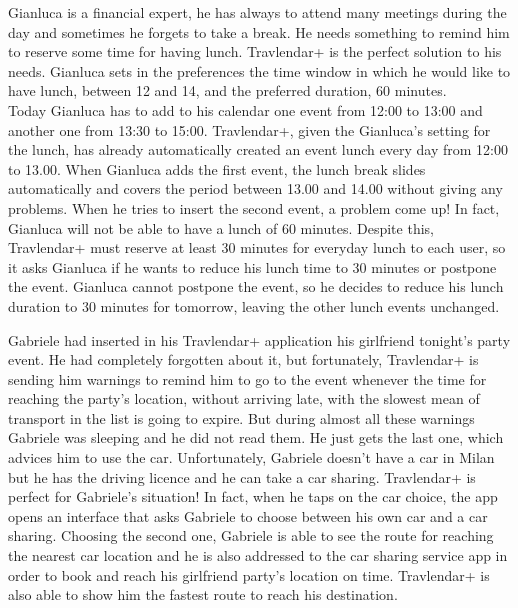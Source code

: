 Gianluca is a financial expert, he has always to attend many meetings during the day and sometimes he forgets to take a break. He needs something to remind him to reserve some time for having lunch. Travlendar+ is the perfect solution to his needs. Gianluca sets in the preferences the time window in which he would like to have lunch, between 12 and 14, and the preferred duration, 60 minutes.\\
Today Gianluca has to add to his calendar one event from 12:00 to 13:00 and another one from 13:30 to 15:00. Travlendar+, given the Gianluca’s setting for the lunch, has already automatically created an event lunch every day from 12:00 to 13.00. When Gianluca adds the first event, the lunch break slides automatically and covers the period between 13.00 and 14.00 without giving any problems. When he tries to insert the second event, a problem come up! In fact, Gianluca will not be able to have a lunch of 60 minutes. Despite this, Travlendar+ must reserve at least 30 minutes for everyday lunch to each user, so it asks Gianluca if he wants to reduce his lunch time to 30 minutes or postpone the event. Gianluca cannot postpone the event, so he decides to reduce his lunch duration to 30 minutes for tomorrow, leaving the other lunch events unchanged.

\newpage
{}
Gabriele had inserted in his Travlendar+ application his girlfriend tonight’s party event. He had completely forgotten about it, but fortunately, Travlendar+ is sending him warnings to remind him to go to the event whenever the time for reaching the party’s location, without arriving late, with the slowest mean of transport in the list is going to expire. But during almost all these warnings Gabriele was sleeping and he did not read them. He just gets the last one, which advices him to use the car. Unfortunately, Gabriele doesn’t have a car in Milan but he has the driving licence and he can take a car sharing. Travlendar+ is perfect for Gabriele’s situation! In fact, when he taps on the car choice, the app opens an interface that asks Gabriele to choose between his own car and a car sharing. Choosing the second one, Gabriele is able to see the route for reaching the nearest car location and he is also addressed to the car sharing service app in order to book and reach his girlfriend party’s location on time. Travlendar+ is also able to show him the fastest route to reach his destination.